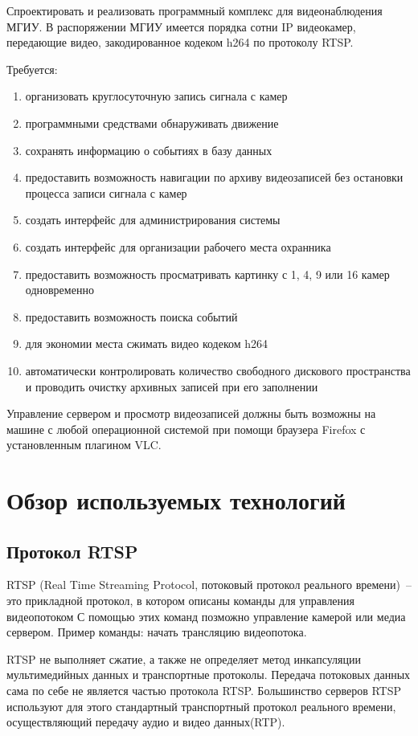 Спроектировать и реализовать программный комплекс для видеонаблюдения МГИУ. В распоряжении МГИУ
имеется порядка сотни IP видеокамер, передающие видео, закодированное кодеком h264 по протоколу RTSP.

\medskip

Требуется:
\smallskip
\begin{enumerate}
	\item организовать круглосуточную запись сигнала с камер
	\item программными средствами обнаруживать движение
	\item сохранять информацию о событиях в базу данных
	\item предоставить возможность навигации по архиву видеозаписей без остановки процесса записи сигнала с камер
	\item создать интерфейс для администрирования системы
	\item создать интерфейс для организации рабочего места охранника
	\item предоставить возможность просматривать картинку с 1, 4, 9 или 16 камер одновременно
	\item предоставить возможность поиска событий
	\item для экономии места сжимать видео кодеком h264
	\item автоматически контролировать количество свободного дискового пространства и проводить очистку архивных записей при его заполнении
\end{enumerate}

Управление сервером и просмотр видеозаписей должны быть возможны на машине с любой операционной
системой при помощи браузера Firefox с установленным плагином VLC.


\section{Обзор используемых технологий}

\subsection{Протокол RTSP}
RTSP (Real Time Streaming Protocol, потоковый протокол реального времени)~-- это прикладной протокол,
в котором описаны команды для управления видеопотоком
С помощью этих команд позможно управление камерой или медиа сервером.
Пример команды: начать трансляцию видеопотока.

RTSP не выполняет сжатие, а также не определяет метод инкапсуляции мультимедийных данных и
транспортные протоколы. Передача потоковых данных сама по себе не является частью протокола RTSP.
Большинство серверов RTSP используют для этого стандартный транспортный протокол реального времени,
осуществляющий передачу аудио и видео данных(RTP).

